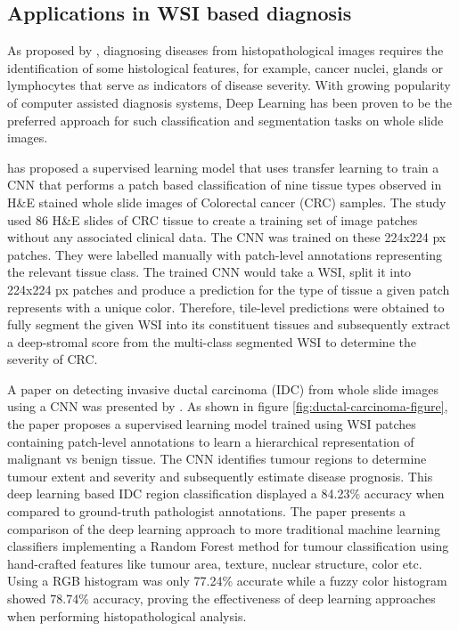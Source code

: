 \documentclass{l4proj}
\begin{document}
\subsection{Applications in WSI based diagnosis}
As proposed by \cite{gurcan2009histopathological}, diagnosing diseases from histopathological images requires the identification of some histological features, for example, cancer nuclei, glands or lymphocytes that serve as indicators of disease severity. With growing popularity of computer assisted diagnosis systems, Deep Learning has been proven to be the preferred approach for such classification and segmentation tasks on whole slide images. 

\cite{Kather2019} has proposed a supervised learning model that uses transfer learning to train a CNN that performs a patch based classification of nine tissue types observed in H\&E stained whole slide images of Colorectal cancer (CRC) samples. The study used 86 H\&E slides of CRC tissue to create a training set of image patches without any associated clinical data. The CNN was trained on these 224x224 px patches. They were labelled manually with patch-level annotations representing the relevant tissue class. The trained CNN would take a WSI, split it into 224x224 px patches and produce a prediction for the type of tissue a given patch represents with a unique color. Therefore, tile-level predictions were obtained to fully segment the given WSI into its constituent tissues and subsequently extract a deep-stromal score from the multi-class segmented WSI to determine the severity of CRC. 

A paper on detecting invasive ductal carcinoma (IDC) from whole slide images using a CNN was presented by \cite{cruz2014automatic}. As shown in figure \ref{fig:ductal-carcinoma-figure}, the paper proposes a supervised learning model trained using WSI patches containing patch-level annotations to learn a hierarchical  representation of malignant vs benign tissue. The CNN identifies tumour regions to determine tumour extent and severity and subsequently estimate disease prognosis. This deep learning based IDC region classification displayed a 84.23\% accuracy when compared to ground-truth pathologist annotations. The paper presents a comparison of the deep learning approach to more traditional machine learning classifiers implementing a Random Forest method for tumour classification using hand-crafted features like tumour area, texture, nuclear structure, color etc. Using a RGB histogram was only 77.24\% accurate while a fuzzy color histogram showed 78.74\% accuracy, proving the effectiveness of deep learning approaches when performing histopathological analysis. 
\end{document}
